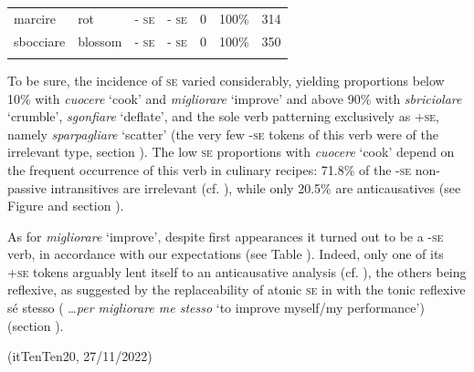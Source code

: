 \documentclass[output=paper,colorlinks,citecolor=brown
]{langscibook}
\begin{document}
\begin{table}[hbt!]
{\begin{tabular}{|p{}|p{}||p{}|p{}||p{}|p{}||p{}|}
marcire      & rot       & - \textsc{se}                                                                                     & - \textsc{se}                                                                          & 0                                 & 100\%                                     & 314                 \\
sbocciare    & blossom   & - \textsc{se}                                                                                     & - \textsc{se}                                                                          & 0                                 & 100\%                                     & 350    \\   \lspbottomrule         
\end{tabular}}
\end{table}

To be sure, the incidence of \textsc{se} varied considerably, yielding proportions below 10\% with \textit{cuocere} ‘cook’ and \textit{migliorare} ‘improve’ and above 90\% with \textit{sbriciolare} ‘crumble’, \textit{sgonfiare} ‘deflate’, and the sole verb patterning exclusively as +\textsc{se}, namely \textit{sparpagliare} ‘scatter’ (the very few -\textsc{se} tokens of this verb were of the irrelevant type, section ). The low \textsc{se} proportions with \textit{cuocere} ‘cook’ depend on the frequent occurrence of this verb in culinary recipes: 71.8\% of the -\textsc{se} non-passive intransitives are irrelevant (cf. ), while only 20.5\% are anticausatives (see Figure  and section ).

As for \textit{migliorare} ‘improve’, despite first appearances it turned out to be a -\textsc{se} verb, in accordance with our expectations (see Table ). Indeed, only one of its +\textsc{se} tokens arguably lent itself to an anticausative analysis (cf. ), the others being reflexive, as suggested by the replaceability of atonic \textsc{se} in  with the tonic reflexive sé stesso ( \ldots  \textit{per migliorare me stesso} ‘to improve myself/my performance’) (section ).

\hspace*{\fill}(itTenTen20, 27/11/2022)\quad
\end{document}
